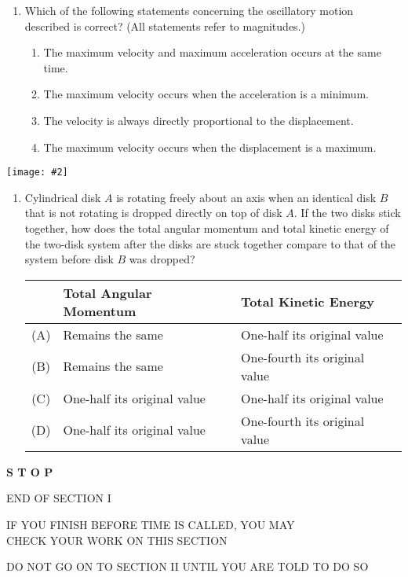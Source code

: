 \documentclass[11pt]{article}
\newcommand{\pic}[2]{\texttt{[image: \#2]}}
\begin{document}
\begin{multicols}{2}
\begin{enumerate}[leftmargin=18pt,resume]
  \item Which of the following statements concerning the oscillatory motion
    described is correct? (All statements refer to magnitudes.)
    \label{mass2}
    \begin{enumerate}[noitemsep,topsep=0pt,leftmargin=18pt,label=(\Alph*)]
    \item The maximum velocity and maximum acceleration occurs at the same time.
    \item The maximum velocity occurs when the acceleration is a minimum.
    \item The velocity is always directly proportional to the displacement.
    \item The maximum velocity occurs when the displacement is a maximum.
    \end{enumerate}
  \end{enumerate}
\end{multicols}

\vspace{.7in}
\begin{center}
  \pic{.3}{disks}
  
  \begin{minipage}{.6\textwidth}
    \begin{enumerate}[leftmargin=18pt,start=31]
    \item Cylindrical disk $A$ is rotating freely about an axis when an
      identical disk $B$ that is not rotating is dropped directly on top of disk
      $A$. If the two disks stick together, how does the total angular momentum
      and total kinetic energy of the two-disk system after the disks are stuck
      together compare to that of the system before disk $B$ was dropped?
  
      \begin{tabular}{cll}
        & Total Angular Momentum & Total Kinetic Energy\\
        \hline
        (A) & Remains the same & One-half its original value\\
        (B) & Remains the same & One-fourth its original value\\
        (C) & One-half its original value & One-half its original value\\
        (D) & One-half its original value & One-fourth its original value
      \end{tabular}
    \end{enumerate}
  \end{minipage}
\end{center}
\begin{center}
  \textbf{\LARGE S T O P}
  
  \vspace{.3in}END OF SECTION I

  \vspace{.3in}IF YOU FINISH BEFORE TIME IS CALLED, YOU MAY\\
  CHECK YOUR WORK ON THIS SECTION

  \vspace{.3in}DO NOT GO ON TO SECTION II UNTIL YOU ARE TOLD TO DO SO
\end{center}
\end{document}
